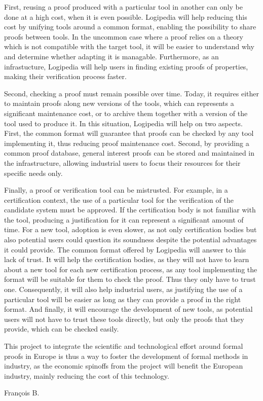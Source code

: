 First, reusing a proof produced with a particular tool in another
can only be done at a high cost, when it is even possible.
{\sf Logipedia} will help reducing this cost by unifying tools
around a common format, enabling the possibility to share proofs
between tools. In the uncommon case where a proof relies on a theory
which is not compatible with the target tool, it will be easier to
understand why and determine whether adapting it is managable.
Furthermore, as an infrastucture, {\sf Logipedia} will help users
in finding existing proofs of properties, making their verification
process faster.

Second, checking a proof must remain possible over time. Today, it
requires either to maintain proofs along new versions of the tools,
which can represents a significant maintenance cost, or to archive
them together with a version of the tool used to produce it. In this
situation, {\sf Logipedia} will help on two aspects. First, the
common format will guarantee that proofs can be checked by any tool
implementing it, thus reducing proof maintenance cost. Second, by
providing a common proof database, general interest proofs can be
stored and maintained in the infrastructure, allowing industrial users
to focus their resources for their specific needs only.

Finally, a proof or verification tool can be mistrusted. For example,
in a certification context, the use of a particular tool for the
verification of the candidate system must be approved. If the
certification body is not familiar with the tool, producing a
justification for it can represent a significant amount of time. For
a new tool, adoption is even slower, as not only certification
bodies but also potential users could question its soundness despite
the potential advantages it could provide. The common format offered
by {\sf Logipedia} will answer to this lack of trust. It will help
the certification bodies, as they will not have to learn about a new
tool for each new certification process, as any tool implementing
the format will be suitable for them to check the proof. Thus they
only have to trust one. Consequently, it will also help industrial
users, as justifying the use of a particular tool will be easier as
long as they can provide a proof in the right format. And finally, it
will encourage the development of new tools, as potential users will
not have to trust these tools directly, but only the proofs that they
provide, which can be checked easily.

This project to integrate the scientific and technological effort
around formal proofs in Europe is thus a way to foster the
development of formal methods in industry, as the economic spinoffs
from the project will benefit the European industry, mainly reducing
the cost of this technology.

{\color{red}
François B.}


